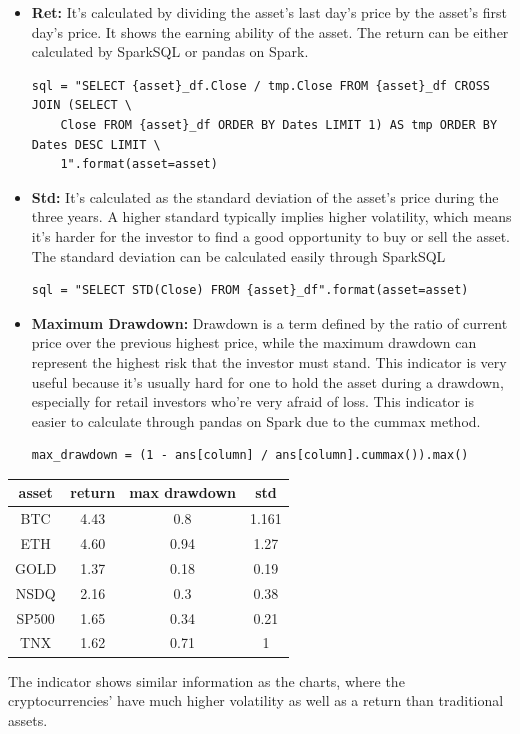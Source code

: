 \documentclass[a4paper]{article}
\begin{document}
\begin{itemize}
    \item \textbf{Ret: } It's calculated by dividing the asset's last day's price by the asset's first day's price. It shows the earning ability of the asset. The return can be either calculated by SparkSQL or pandas on Spark.
\begin{verbatim}
sql = "SELECT {asset}_df.Close / tmp.Close FROM {asset}_df CROSS JOIN (SELECT \
    Close FROM {asset}_df ORDER BY Dates LIMIT 1) AS tmp ORDER BY Dates DESC LIMIT \
    1".format(asset=asset)
\end{verbatim}
    \item \textbf{Std: } It's calculated as the standard deviation of the asset's price during the three years. A higher standard typically implies higher volatility, which means it's harder for the investor to find a good opportunity to buy or sell the asset. The standard deviation can be calculated easily through SparkSQL
\begin{verbatim}
sql = "SELECT STD(Close) FROM {asset}_df".format(asset=asset)
\end{verbatim}
    \item \textbf{Maximum Drawdown: } Drawdown is a term defined by the ratio of current price over the previous highest price, while the maximum drawdown can represent the highest risk that the investor must stand. This indicator is very useful because it's usually hard for one to hold the asset during a drawdown, especially for retail investors who're very afraid of loss. This indicator is easier to calculate through pandas on Spark due to the cummax method.
\begin{verbatim}
max_drawdown = (1 - ans[column] / ans[column].cummax()).max()
\end{verbatim}
\end{itemize}
\begin{table}[H]
    \centering
    \begin{tabular}{@{}|c|c|c|c|@{}}
    \hline
    asset   & return & max drawdown & std   \\ \hline
    BTC & 4.43   & 0.8          & 1.161 \\ \hline
    ETH & 4.60   & 0.94         & 1.27  \\ \hline
    GOLD    & 1.37   & 0.18         & 0.19  \\ \hline
    NSDQ    & 2.16   & 0.3          & 0.38  \\ \hline
    SP500   & 1.65   & 0.34         & 0.21  \\ \hline
    TNX     & 1.62   & 0.71         & 1     \\ \hline
    \end{tabular}
\end{table}
\par The indicator shows similar information as the charts, where the cryptocurrencies’ have much higher volatility as well as a return than traditional assets.
\end{document}
